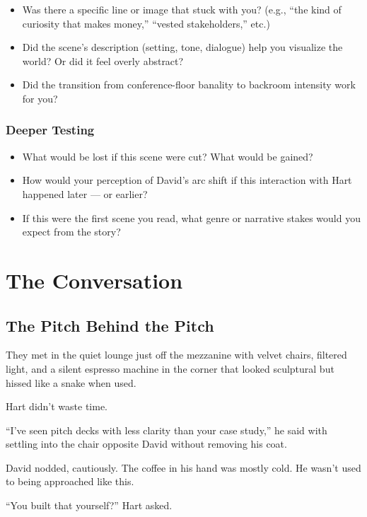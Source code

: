 \begin{itemize}
  \item Was there a specific line or image that stuck with you? (e.g., “the kind of curiosity that makes money,” “vested stakeholders,” etc.)
  \item Did the scene’s description (setting, tone, dialogue) help you visualize the world? Or did it feel overly abstract?
  \item Did the transition from conference-floor banality to backroom intensity work for you?
\end{itemize}

\subsubsection{Deeper Testing}

\begin{itemize}
  \item What would be lost if this scene were cut? What would be gained?
  \item How would your perception of David’s arc shift if this interaction with Hart happened later — or earlier?
  \item If this were the first scene you read, what genre or narrative stakes would you expect from the story?
\end{itemize}



\section{The Conversation}

\subsection{The Pitch Behind the Pitch}

They met in the quiet lounge just off the mezzanine with
velvet chairs, filtered light, and a silent espresso machine in the corner that looked sculptural but hissed like a 
snake when used. 

Hart didn’t waste time.

``I’ve seen pitch decks with less clarity than your case study,'' he said with settling into the chair opposite David 
without removing his coat.

David nodded, cautiously. The coffee in his hand was mostly cold. He wasn’t used to being approached like this.

``You built that yourself?'' Hart asked.


